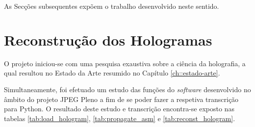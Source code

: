 As Secções subsequentes expõem o trabalho desenvolvido neste sentido.


\section{Reconstrução dos Hologramas}
\label{sec::imp-test:reconst-hologram}

O projeto iniciou-se com uma pesquisa exaustiva sobre a ciência da holografia, a qual resultou no Estado da Arte resumido no Capítulo \ref{ch::estado-arte}.

Simultaneamente, foi efetuado um estudo das funções do \textit{software} desenvolvido no âmbito do projeto JPEG Pleno a fim de se poder fazer a respetiva transcrição para Python. O resultado deste estudo e transcrição encontra-se exposto nas tabelas \ref{tab:load_hologram}, \ref{tab:propagate_asm} e \ref{tab:reconst_hologram}.


